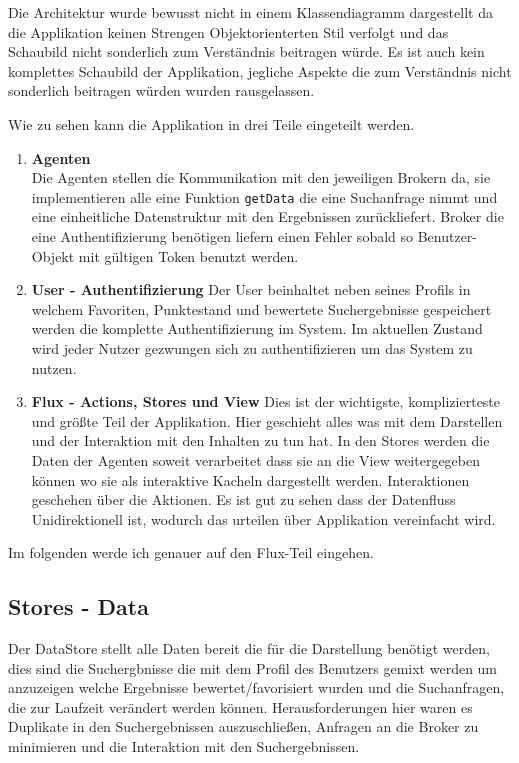 \documentclass[12pt,twoside]{book}
\begin{document}
Die Architektur wurde bewusst nicht in einem Klassendiagramm dargestellt da die Applikation keinen Strengen Objektorienterten Stil verfolgt und das Schaubild nicht sonderlich zum Verständnis beitragen würde. Es ist auch kein komplettes Schaubild der Applikation, jegliche Aspekte die zum Verständnis nicht sonderlich beitragen würden wurden rausgelassen.

Wie zu sehen kann die Applikation in drei Teile eingeteilt werden.

\begin{enumerate}
  \item \textbf{Agenten} \\
  Die Agenten stellen die Kommunikation mit den jeweiligen Brokern da, sie implementieren alle eine Funktion \texttt{getData} die eine Suchanfrage  nimmt und eine einheitliche Datenstruktur mit den Ergebnissen zurückliefert. Broker die eine Authentifizierung benötigen liefern einen Fehler sobald so Benutzer-Objekt mit gültigen Token benutzt werden.
  \item \textbf{User - Authentifizierung}
  Der User beinhaltet neben seines Profils in welchem Favoriten, Punktestand und bewertete Suchergebnisse gespeichert werden die komplette Authentifizierung im System. Im aktuellen Zustand wird jeder Nutzer gezwungen sich zu authentifizieren um das System zu nutzen.
  \item \textbf{Flux - Actions, Stores und View}
  Dies ist der wichtigste, komplizierteste und größte Teil der Applikation. Hier geschieht alles was mit dem Darstellen und der Interaktion mit den Inhalten zu tun hat. In den Stores werden die Daten der Agenten soweit verarbeitet dass sie an die View weitergegeben können wo sie als interaktive Kacheln dargestellt werden. Interaktionen geschehen über die Aktionen. Es ist gut zu sehen dass der Datenfluss Unidirektionell ist, wodurch das urteilen über Applikation vereinfacht wird.

\end{enumerate}

Im folgenden werde ich genauer auf den Flux-Teil eingehen.

\subsection{Stores - Data}

Der DataStore stellt alle Daten bereit die für die Darstellung benötigt werden, dies sind die Suchergbnisse die mit dem Profil des Benutzers gemixt werden um anzuzeigen welche Ergebnisse bewertet/favorisiert wurden und die Suchanfragen, die zur Laufzeit verändert werden können. Herausforderungen hier waren es Duplikate in den Suchergebnissen auszuschließen, Anfragen an die Broker zu minimieren und die Interaktion mit den Suchergebnissen.
\end{document}
